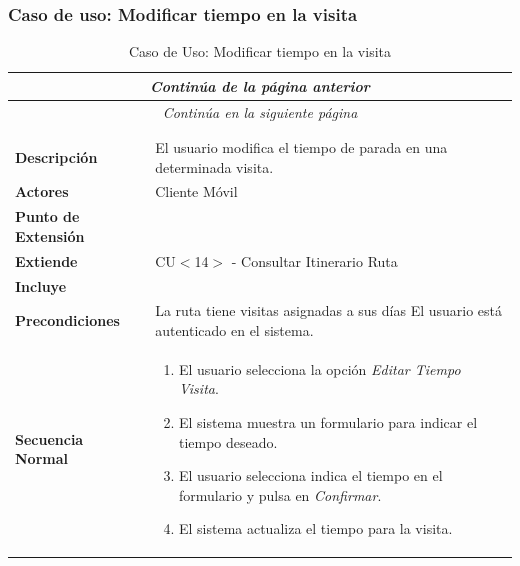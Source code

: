 \subsubsection*{Caso de uso: Modificar tiempo en la visita }
\begin{longtable}{| p{4cm} | p{10cm} |}
\endfirsthead
\multicolumn{2}{c}{\textit{Continúa de la página anterior}}\\[12pt]
\hline
\endhead
\hline
\multicolumn{2}{c}{\textit{Continúa en la siguiente página}} \\
\endfoot
\hline
\caption{Caso de Uso: Modificar tiempo en la visita}\label{fig:1}\\
\endlastfoot


\hline
\multicolumn{2}{|c|}{\textbf{CU$<$18$>$ - Modificar Tiempo en la Visita}} \\

\hline
\textbf{Descripción} &
El usuario modifica el tiempo de parada en una determinada visita.\\

\hline
\textbf{Actores} &
Cliente Móvil\\

\hline
\textbf{Punto de Extensión} &
\\

\hline
\textbf{Extiende} &
CU$<$14$>$ - Consultar Itinerario Ruta
\\

\hline
\textbf{Incluye} &
\\

\hline
\textbf{Precondiciones} &
La ruta tiene visitas asignadas a sus días\newline
El usuario está autenticado en el sistema.\\

\hline
\textbf{Secuencia Normal} &\mbox{}\par\vspace{-\baselineskip}
\begin{enumerate}[leftmargin=0.7cm, topsep=0.1cm]
\item El usuario selecciona la opción \textit{Editar Tiempo Visita}.
\item El sistema muestra un formulario para indicar el tiempo deseado.
\item El usuario selecciona indica el tiempo en el formulario y pulsa en \textit{Confirmar}.
\item El sistema actualiza el tiempo para la visita.

\end{enumerate}



\end{longtable}
